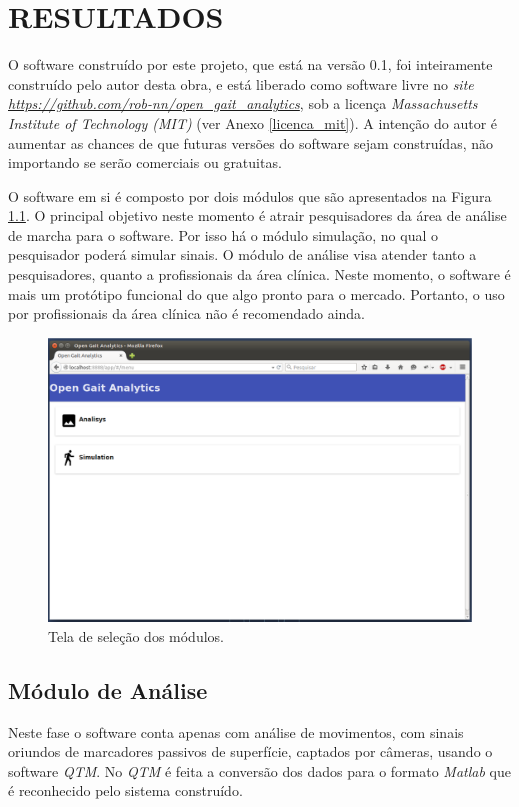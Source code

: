 \chapter[RESULTADOS]{\textbf {RESULTADOS}}

O software construído por este projeto, que está na versão 0.1, foi inteiramente construído pelo autor desta obra, e está liberado como software livre no \emph{site \url{https://github.com/rob-nn/open\_gait\_analytics}}, sob a licença \emph{Massachusetts Institute of Technology (MIT)} (ver Anexo \ref{licenca_mit}). A intenção do autor é aumentar as chances de que futuras versões do software sejam construídas, não importando se serão comerciais ou gratuitas.

O software em si é composto por dois módulos que são apresentados na Figura \ref{tela1}. O principal objetivo neste momento é atrair pesquisadores da área de análise de marcha para o software. Por isso há o módulo simulação, no qual o pesquisador poderá simular sinais.
O módulo de análise visa atender tanto a pesquisadores, quanto a profissionais da área clínica. Neste momento, o software é mais um protótipo funcional do que algo pronto para o mercado. Portanto, o uso por profissionais da área clínica não é recomendado ainda.

\begin{figure}[H]
	\centering
	\includegraphics[width=15cm]{figuras/tela1.eps}
	\caption{Tela de seleção dos módulos.}
	\label{tela1}
\end{figure}

\section{Módulo de Análise}
Neste fase o software conta apenas com análise de movimentos, com sinais oriundos de marcadores passivos de superfície, captados por câmeras, usando o software \emph{QTM}. 
No \emph{QTM} é feita a conversão dos dados para o formato \emph{Matlab} que é reconhecido pelo sistema construído.

